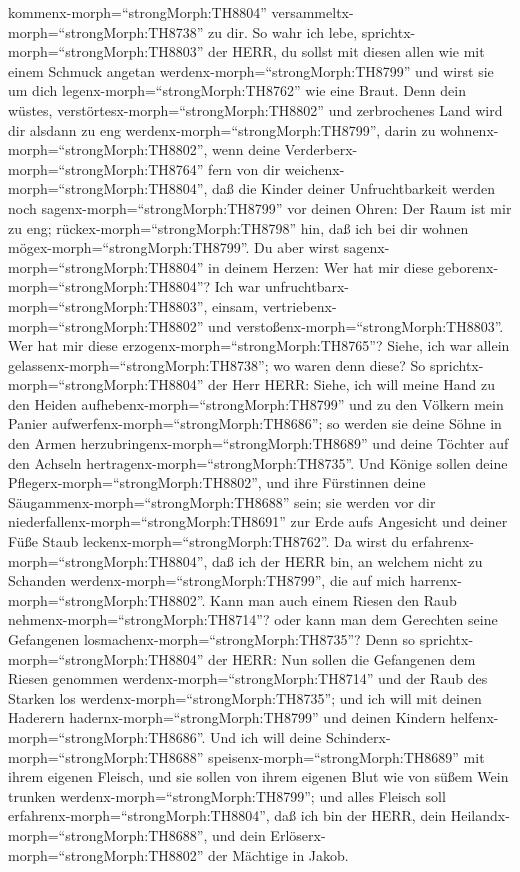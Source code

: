 kommenx-morph=``strongMorph:TH8804''
versammeltx-morph=``strongMorph:TH8738'' zu dir. So wahr ich lebe,
sprichtx-morph=``strongMorph:TH8803'' der HERR, du sollst mit diesen
allen wie mit einem Schmuck angetan werdenx-morph=``strongMorph:TH8799''
und wirst sie um dich legenx-morph=``strongMorph:TH8762'' wie eine
Braut.  Denn dein wüstes,
verstörtesx-morph=``strongMorph:TH8802'' und zerbrochenes Land wird dir
alsdann zu eng werdenx-morph=``strongMorph:TH8799'', darin zu
wohnenx-morph=``strongMorph:TH8802'', wenn deine
Verderberx-morph=``strongMorph:TH8764'' fern von dir
weichenx-morph=``strongMorph:TH8804'',  daß die Kinder
deiner Unfruchtbarkeit werden noch sagenx-morph=``strongMorph:TH8799''
vor deinen Ohren: Der Raum ist mir zu eng;
rückex-morph=``strongMorph:TH8798'' hin, daß ich bei dir wohnen
mögex-morph=``strongMorph:TH8799''.  Du aber wirst
sagenx-morph=``strongMorph:TH8804'' in deinem Herzen: Wer hat mir diese
geborenx-morph=``strongMorph:TH8804''? Ich war
unfruchtbarx-morph=``strongMorph:TH8803'', einsam,
vertriebenx-morph=``strongMorph:TH8802'' und
verstoßenx-morph=``strongMorph:TH8803''. Wer hat mir diese
erzogenx-morph=``strongMorph:TH8765''? Siehe, ich war allein
gelassenx-morph=``strongMorph:TH8738''; wo waren denn diese?
 So sprichtx-morph=``strongMorph:TH8804'' der Herr HERR:
Siehe, ich will meine Hand zu den Heiden
aufhebenx-morph=``strongMorph:TH8799'' und zu den Völkern mein Panier
aufwerfenx-morph=``strongMorph:TH8686''; so werden sie deine Söhne in
den Armen herzubringenx-morph=``strongMorph:TH8689'' und deine Töchter
auf den Achseln hertragenx-morph=``strongMorph:TH8735''. 
Und Könige sollen deine Pflegerx-morph=``strongMorph:TH8802'', und ihre
Fürstinnen deine Säugammenx-morph=``strongMorph:TH8688'' sein; sie
werden vor dir niederfallenx-morph=``strongMorph:TH8691'' zur Erde aufs
Angesicht und deiner Füße Staub leckenx-morph=``strongMorph:TH8762''. Da
wirst du erfahrenx-morph=``strongMorph:TH8804'', daß ich der HERR bin,
an welchem nicht zu Schanden werdenx-morph=``strongMorph:TH8799'', die
auf mich harrenx-morph=``strongMorph:TH8802''.  Kann man
auch einem Riesen den Raub nehmenx-morph=``strongMorph:TH8714''? oder
kann man dem Gerechten seine Gefangenen
losmachenx-morph=``strongMorph:TH8735''?  Denn so
sprichtx-morph=``strongMorph:TH8804'' der HERR: Nun sollen die
Gefangenen dem Riesen genommen werdenx-morph=``strongMorph:TH8714'' und
der Raub des Starken los werdenx-morph=``strongMorph:TH8735''; und ich
will mit deinen Haderern hadernx-morph=``strongMorph:TH8799'' und deinen
Kindern helfenx-morph=``strongMorph:TH8686''.  Und ich will
deine Schinderx-morph=``strongMorph:TH8688''
speisenx-morph=``strongMorph:TH8689'' mit ihrem eigenen Fleisch, und sie
sollen von ihrem eigenen Blut wie von süßem Wein trunken
werdenx-morph=``strongMorph:TH8799''; und alles Fleisch soll
erfahrenx-morph=``strongMorph:TH8804'', daß ich bin der HERR, dein
Heilandx-morph=``strongMorph:TH8688'', und dein
Erlöserx-morph=``strongMorph:TH8802'' der Mächtige in Jakob.

